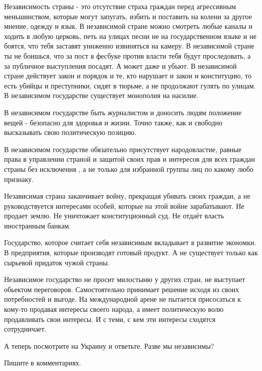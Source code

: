Независимость страны - это отсутствие страха граждан перед агрессивным
меньшинством, которые могут запугать, избить и поставить на колени за другое
мнение, одежду и язык. В независимой стране можно смотреть любые каналы и
ходить в любую церковь, петь на улицах песни не на государственном языке и не
боятся, что тебя заставят униженно извиняться на камеру. В независимой стране
ты не боишься, что за пост в фесбуке против власти тебя будут проследовать, а
за публичное выступления посадят. А может даже и убьют. В независимой стране
действует закон и порядок и те, кто нарушает и закон и конституцию, то есть
убийцы и преступники, сидят в тюрьме, а не продолжают гулять по улицам. В
независимом государстве существует монополия на насилие. 

В независимом государстве быть журналистом и доносить людям положение вещей -
безопасно для здоровья и жизни. Точно также, как и свободно высказывать свою
политическую позицию. 

В независимом государстве обязательно присутствует народовластие, равные права
в управлении страной и защитой своих прав и интересов для всех граждан страны
без исключения , а не только для избранной группы лиц по какому любо признаку.

Независимая страна заканчивает войну, прекращая убивать своих граждан, а не
руководствуется интересами особей, которые на этой войне зарабатывают. Не
продает землю. Не уничтожает конституционный суд. Не отдаёт власть иностранным
банкам. 

Государство, которое считает себя независимым вкладывает в развитие экономки. В
предприятия, которые производят готовый продукт. А не существует только как
сырьевой придаток чужой страны. 

Независимое государство не просит милостыню у других стран, не выступает
обьектом переговоров. Самостоятельно принимает решение исходя из своих
потребностей и выгоде. На международной арене не пытается присосаться к кому-то
продавая интересы своего народа, а имеет политическую волю продавливать свои
интересы. И с теми, с кем эти интересы сходятся сотрудничает. 

А теперь посмотрите на Украину и ответьте. Разве мы независимы? 

Пишите в комментариях.
